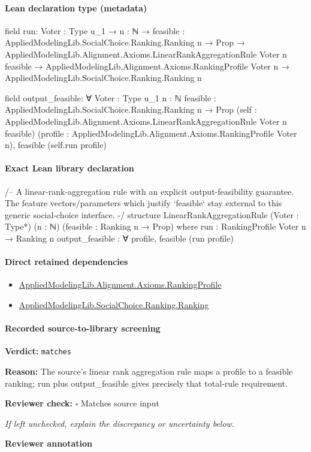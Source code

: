 \documentclass[10pt]{article}
\newcommand{\reviewerbox}{%
  \par\noindent\fbox{\parbox{0.96\linewidth}{\rule{0pt}{0.38in}}}\par
}
\newcommand{\reviewmatch}[1]{%
  \par\noindent\textbf{Reviewer check:} $\square$\; #1\par
  \noindent\emph{If left unchecked, explain the discrepancy or uncertainty below.}\par
}
\begin{document}
\paragraph{Lean declaration type (metadata)}
\begin{ReviewVerbatim}
field run:
{Voter : Type u_1} →
  {n : ℕ} →
    {feasible : AppliedModelingLib.SocialChoice.Ranking.Ranking n → Prop} →
      AppliedModelingLib.Alignment.Axioms.LinearRankAggregationRule Voter n feasible →
        AppliedModelingLib.Alignment.Axioms.RankingProfile Voter n → AppliedModelingLib.SocialChoice.Ranking.Ranking n

field output_feasible:
∀ {Voter : Type u_1} {n : ℕ} {feasible : AppliedModelingLib.SocialChoice.Ranking.Ranking n → Prop}
  (self : AppliedModelingLib.Alignment.Axioms.LinearRankAggregationRule Voter n feasible)
  (profile : AppliedModelingLib.Alignment.Axioms.RankingProfile Voter n), feasible (self.run profile)
\end{ReviewVerbatim}

\paragraph{Exact Lean library declaration}
\begin{ReviewVerbatim}
/--
A linear-rank-aggregation rule with an explicit output-feasibility guarantee.
The feature vectors/parameters which justify `feasible` stay external to this
generic social-choice interface.
-/
structure LinearRankAggregationRule (Voter : Type*) (n : ℕ)
    (feasible : Ranking n → Prop) where
  run : RankingProfile Voter n → Ranking n
  output_feasible : ∀ profile, feasible (run profile)
\end{ReviewVerbatim}

\paragraph{Direct retained dependencies}
\begin{itemize}\raggedright
\item \hyperlink{library-prerequisite-9bded048a60dfe0a}{Applied\allowbreak{}Modeling\allowbreak{}Lib.\allowbreak{}Alignment.\allowbreak{}Axioms.\allowbreak{}Ranking\allowbreak{}Profile}
\item \hyperlink{library-prerequisite-5cde54446d1ae021}{Applied\allowbreak{}Modeling\allowbreak{}Lib.\allowbreak{}Social\allowbreak{}Choice.\allowbreak{}Ranking.\allowbreak{}Ranking}
\end{itemize}
\paragraph{Recorded source-to-library screening}
\textbf{Verdict:} \texttt{matches}
\\
{\raggedright
\textbf{Reason:} The source's linear rank aggregation rule maps a profile to a feasible ranking;\allowbreak{} run plus output\_\allowbreak{}feasible gives precisely that total-\allowbreak{}rule requirement.\allowbreak{}
\par}
\reviewmatch{Matches source input}
\noindent\textbf{Reviewer annotation}\par
\reviewerbox
\clearpage
\hypertarget{library-prerequisite-8feb80e31f32c9f1}{}
\end{document}
